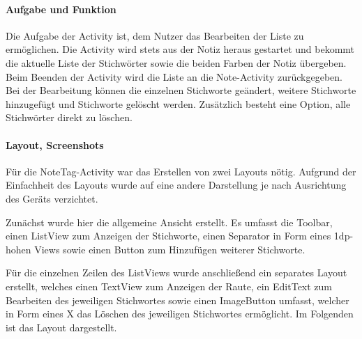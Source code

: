 \paragraph{Aufgabe und Funktion}
Die Aufgabe der Activity ist, dem Nutzer das Bearbeiten der Liste zu ermöglichen. Die Activity wird stets aus der Notiz heraus gestartet und bekommt die aktuelle Liste der Stichwörter sowie die beiden Farben der Notiz übergeben. Beim Beenden der Activity wird die Liste an die Note-Activity zurückgegeben. Bei der Bearbeitung können die einzelnen Stichworte geändert, weitere Stichworte hinzugefügt und Stichworte gelöscht werden. Zusätzlich besteht eine Option, alle Stichwörter direkt zu löschen.

\paragraph{Layout, Screenshots}
Für die NoteTag-Activity war das Erstellen von zwei Layouts nötig. Aufgrund der Einfachheit des Layouts wurde auf eine andere Darstellung je nach Ausrichtung des Geräts verzichtet.

Zunächst wurde hier die allgemeine Ansicht erstellt. Es umfasst die Toolbar, einen ListView zum Anzeigen der Stichworte, einen Separator in Form eines 1dp-hohen Views sowie einen Button zum Hinzufügen weiterer Stichworte.

Für die einzelnen Zeilen des ListViews wurde anschließend ein separates Layout erstellt, welches einen TextView zum Anzeigen der Raute, ein EditText zum Bearbeiten des jeweiligen Stichwortes sowie einen ImageButton umfasst, welcher in Form eines X das Löschen des jeweiligen Stichwortes ermöglicht.
Im Folgenden ist das Layout dargestellt.

